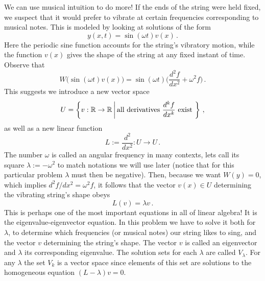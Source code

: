 \begin{example}
We can use musical intuition to do more! If the ends of the string were held fixed, we suspect that it would prefer to vibrate at certain frequencies corresponding to musical notes.
This is modeled by looking at solutions of the form
\[
y(x,t)=\sin(\omega t) v(x)\, .
\]
Here the periodic sine function accounts for the string's vibratory motion, while the function $v(x)$ gives the shape of the string at any fixed instant of time. Observe that
\[
W\big(\sin(\omega t) v(x)\big)=\sin(\omega t)\big(\frac{d^2f}{dx^2}+\omega^2 f\big)\, .
\]
This suggests we introduce a new vector space \[U=\left\{v:{\mathbb R}\to {\mathbb R}\, \middle| \, \mbox{\rm all derivatives } \frac{d^kf}{d x^k }\text{~exist~} \right\}\, ,
\]
as well as a new linear function
\[
L:=\frac{d^2}{dx^2}: U\longrightarrow U\, .
\]
The number $\omega$ is called an angular frequency in many contexts, lets call its square $\lambda:=-\omega^2$ to match notations we will use later (notice that for this particular problem $\lambda$ must then  be negative).
Then, because we want $W(y)=0$, which implies $d^2 f/dx^2=\omega^2 f$, it follows that the vector $v(x)\in U$ determining the vibrating string's shape obeys
\[
L(v)=\lambda v\, .
\]
This is perhaps one of the most important equations in all of linear algebra! It is the eigenvalue-eigenvector equation. In this problem we have to solve it both for $\lambda$, to determine which frequencies (or musical notes) our string likes to sing, and the vector $v$ determining the string's shape. The vector $v$ is called an eigenvector and $\lambda$ its corresponding eigenvalue.
The solution sets for each $\lambda$ are called $V_\lambda$. For any $\lambda$ the set $V_k$ is a vector space since elements of this set are solutions to the homogeneous equation $(L-\lambda)v=0.$ 



\end{example}

